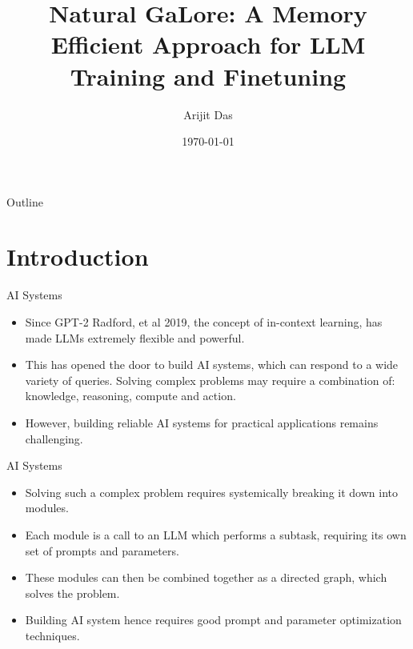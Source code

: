 \documentclass{beamer}
\title{Natural GaLore: A Memory Efficient Approach for LLM Training and Finetuning}
\author{Arijit Das}
\date{\today}
\begin{document}
\begin{frame}
    \titlepage
\end{frame}

\begin{frame}{Outline}
    \tableofcontents
\end{frame}

\section{Introduction}

\begin{frame}{AI Systems}
    \begin{itemize}
        \item Since GPT-2 Radford, et al 2019, the concept of in-context learning, has made LLMs extremely flexible and powerful.
        \item This has opened the door to build AI systems, which can respond to a wide variety of queries. Solving complex problems may require a combination of: knowledge, reasoning, compute and action.
        \item However, building reliable AI systems for practical applications remains challenging.
    \end{itemize}
\end{frame}

\begin{frame}{AI Systems}
    \begin{itemize}
        \item Solving such a complex problem requires systemically breaking it down into modules.
        \item Each module is a call to an LLM which performs a subtask, requiring its own set of prompts and parameters.
        \item These modules can then be combined together as a directed graph, which solves the problem.
        \item Building AI system hence requires good prompt and parameter optimization techniques.
    \end{itemize}
\end{frame}
\end{document}
